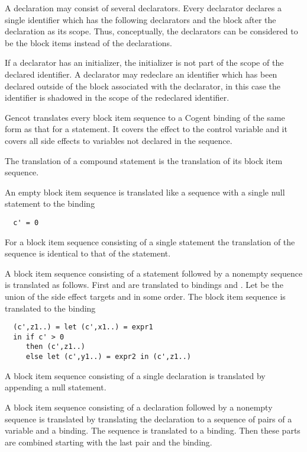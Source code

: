 A declaration may consist of several declarators. Every declarator declares a single identifier which has the following declarators
and the block after the declaration as its scope. Thus, conceptually, the declarators can be considered to be the block items instead
of the declarations. 

If a declarator has an initializer, the initializer is not part of the scope of the declared identifier. A declarator may redeclare 
an identifier which has been declared outside of the block associated with the declarator, in this case the identifier is shadowed
in the scope of the redeclared identifier. 

Gencot translates every block item sequence to a Cogent binding of the same form as that for a statement. It covers the effect to 
the control variable and it covers all side effects to variables not declared in the sequence. 

The translation of a compound statement is the translation of its block item sequence.

An empty block item sequence is translated like a sequence with a single null statement to the
binding
\begin{verbatim}
  c' = 0
\end{verbatim}

For a block item sequence consisting of a single statement the translation of the sequence is identical to that of the statement.

A block item sequence consisting of a statement  followed by a nonempty sequence  is translated as follows. First
 and  are translated 
to bindings  and . Let  be the union of the side effect targets 
 and  in some order. The block item sequence is translated to the binding
\begin{verbatim}
  (c',z1..) = let (c',x1..) = expr1
  in if c' > 0
     then (c',z1..)
     else let (c',y1..) = expr2 in (c',z1..)
\end{verbatim}

A block item sequence consisting of a single declaration is translated by appending a null statement.

A block item sequence consisting of a declaration  followed by a nonempty sequence  is translated by translating 
the declaration to a sequence of pairs of a variable and a binding. The sequence  is translated to a binding. Then 
these parts are combined starting with the last pair and the binding.

